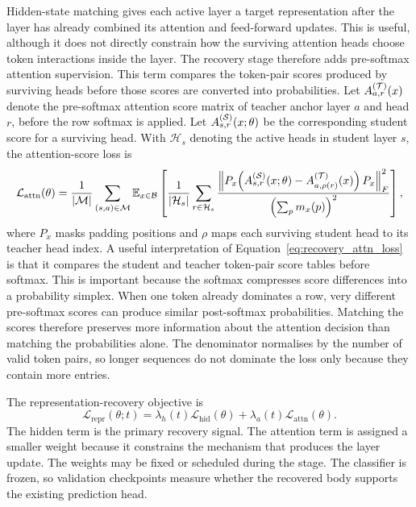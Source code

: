 Hidden-state matching gives each active layer a target representation after the layer has already combined its attention and feed-forward updates. This is useful, although it does not directly constrain how the surviving attention heads choose token interactions inside the layer. The recovery stage therefore adds pre-softmax attention supervision. This term compares the token-pair scores produced by surviving heads before those scores are converted into probabilities. Let $A^{(\mathcal{T})}_{a,r}(x)$ denote the pre-softmax attention score matrix of teacher anchor layer $a$ and head $r$, before the row softmax is applied. Let $A^{(\mathcal{S})}_{s,r}(x;\theta)$ be the corresponding student score for a surviving head. With $\mathcal{H}_s$ denoting the active heads in student layer $s$, the attention-score loss is
\begin{equation}
\mathcal{L}_{\mathrm{attn}}(\theta)
=
\frac{1}{|\mathcal{M}|}
\sum_{(s,a)\in\mathcal{M}}
\mathbb{E}_{x\in\mathcal{B}}
\left[
\frac{1}{|\mathcal{H}_s|}
\sum_{r\in\mathcal{H}_s}
\frac{\left\|P_x\!\left(A^{(\mathcal{S})}_{s,r}(x;\theta)-A^{(\mathcal{T})}_{a,\rho(r)}(x)\right)P_x\right\|_F^2}
{\left(\sum_p m_x(p)\right)^2}
\right],
\label{eq:recovery_attn_loss}
\end{equation}
where $P_x$ masks padding positions and $\rho$ maps each surviving student head to its teacher head index. A useful interpretation of Equation~\ref{eq:recovery_attn_loss} is that it compares the student and teacher token-pair score tables before softmax. This is important because the softmax compresses score differences into a probability simplex. When one token already dominates a row, very different pre-softmax scores can produce similar post-softmax probabilities. Matching the scores therefore preserves more information about the attention decision than matching the probabilities alone. The denominator normalises by the number of valid token pairs, so longer sequences do not dominate the loss only because they contain more entries.

The representation-recovery objective is
\begin{equation}
\mathcal{L}_{\mathrm{repr}}(\theta;t)
=
\lambda_h(t)\mathcal{L}_{\mathrm{hid}}(\theta)
+
\lambda_a(t)\mathcal{L}_{\mathrm{attn}}(\theta).
\label{eq:recovery_repr_loss}
\end{equation}
The hidden term is the primary recovery signal. The attention term is assigned a smaller weight because it constrains the mechanism that produces the layer update. The weights may be fixed or scheduled during the stage. The classifier is frozen, so validation checkpoints measure whether the recovered body supports the existing prediction head.

